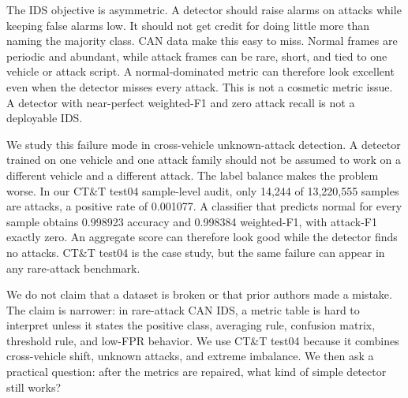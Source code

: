 \documentclass[runningheads]{llncs}
\begin{document}
The IDS objective is asymmetric.  A detector should raise alarms on attacks while keeping false alarms low.  It should not get credit for doing little more than naming the majority class.  CAN data make this easy to miss.  Normal frames are periodic and abundant, while attack frames can be rare, short, and tied to one vehicle or attack script.  A normal-dominated metric can therefore look excellent even when the detector misses every attack.  This is not a cosmetic metric issue.  A detector with near-perfect weighted-F1 and zero attack recall is not a deployable IDS.

We study this failure mode in cross-vehicle unknown-attack detection.  A detector trained on one vehicle and one attack family should not be assumed to work on a different vehicle and a different attack.  The label balance makes the problem worse.  In our CT\&T test04 sample-level audit, only 14,244 of 13,220,555 samples are attacks, a positive rate of 0.001077.  A classifier that predicts normal for every sample obtains 0.998923 accuracy and 0.998384 weighted-F1, with attack-F1 exactly zero.  An aggregate score can therefore look good while the detector finds no attacks.  CT\&T test04 is the case study, but the same failure can appear in any rare-attack benchmark.

We do not claim that a dataset is broken or that prior authors made a mistake.  The claim is narrower: in rare-attack CAN IDS, a metric table is hard to interpret unless it states the positive class, averaging rule, confusion matrix, threshold rule, and low-FPR behavior.  We use CT\&T test04 because it combines cross-vehicle shift, unknown attacks, and extreme imbalance.  We then ask a practical question: after the metrics are repaired, what kind of simple detector still works?
\end{document}
